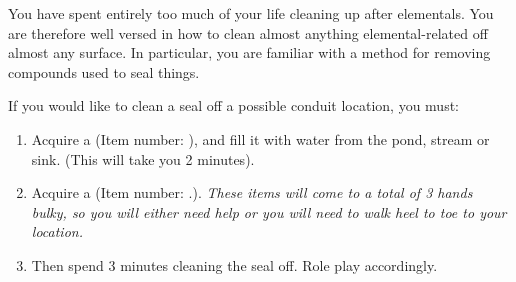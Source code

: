 \documentclass[green]{elementals}
\begin{document}
\name{\gUnsealConduit{}} 

You have spent entirely too much of your life cleaning up after elementals. You are therefore well versed in how to clean almost anything elemental-related off almost any surface. In particular, you are familiar with a method for removing compounds used to seal things. 

If you would like to clean a seal off a possible conduit location, you must: 
\begin{enumerate}
\item Acquire a \iBowl{} (Item number: \iBowl{\MYnumber{}}), and fill it with water from the pond, stream or sink. (This will take you 2 minutes).
\item Acquire a \iLye{} (Item number: \iLye{\MYnumber{}}.). \emph{These items will come to a total of 3 hands bulky, so you will either need help or you will need to  walk heel to toe to your location.} 
\item Then spend 3 minutes cleaning the seal off. Role play accordingly.
\end{enumerate}
\end{document}
